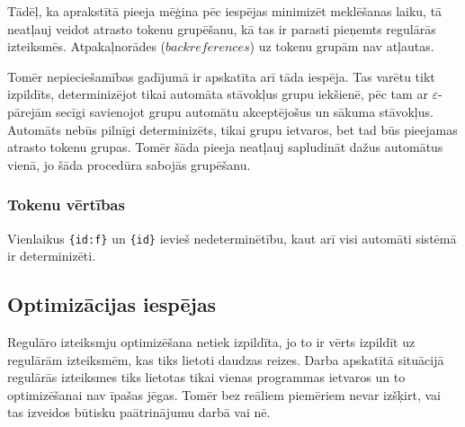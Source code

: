 Tādēļ, ka aprakstītā pieeja mēģina pēc iespējas minimizēt meklēšanas laiku, tā neatļauj veidot atrasto tokenu grupēšanu, kā tas ir parasti pieņemts regulārās izteiksmēs. Atpakaļnorādes ($backreferences$) uz tokenu grupām nav atļautas.

Tomēr nepieciešamības gadījumā ir apskatīta arī tāda iespēja. Tas varētu tikt izpildīts, determinizējot tikai automāta stāvokļus grupu iekšienē, pēc tam ar $\varepsilon$-pārejām secīgi savienojot grupu automātu akceptējošus un sākuma stāvokļus. Automāts nebūs pilnīgi determinizēts, tikai grupu ietvaros, bet tad būs pieejamas atrasto tokenu grupas. Tomēr šāda pieeja neatļauj sapludināt dažus automātus vienā, jo šāda procedūra sabojās grupēšanu.

\subsubsection{Tokenu vērtības}
Vienlaikus \verb|{id:f}| un \verb|{id}| ievieš nedeterminētību, kaut arī visi automāti sistēmā ir determinizēti.

\subsection{\label{subsec:solution_optimization}Optimizācijas iespējas}

Regulāro izteiksmju optimizēšana netiek izpildīta, jo to ir vērts izpildīt uz regulārām izteiksmēm, kas tiks lietoti daudzas reizes. Darba apskatītā situācijā regulārās izteiksmes tiks lietotas tikai vienas programmas ietvaros un to optimizēšanai nav īpašas jēgas. Tomēr bez reāliem piemēriem nevar izšķirt, vai tas izveidos būtisku paātrinājumu darbā vai nē.

